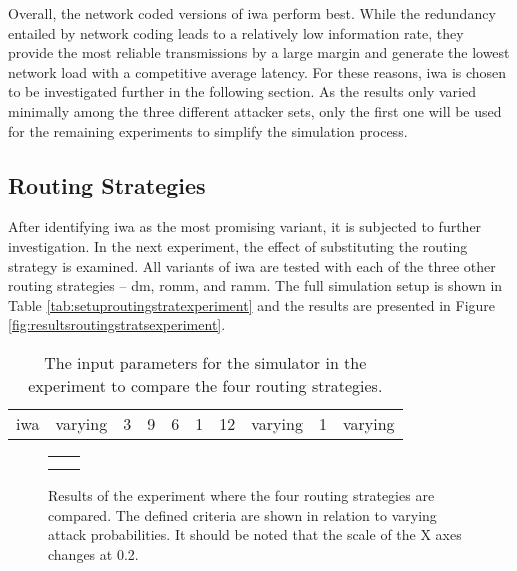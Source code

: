 Overall, the network coded versions of \gls{iwa} perform best. While the redundancy entailed by network coding leads to a relatively low information
rate, they provide the most reliable transmissions by a large margin and generate the lowest network load with a competitive average latency. For
these reasons, \gls{iwa} is chosen to be investigated further in the following section. As the results only varied minimally among the three different
attacker sets, only the first one will be used for the remaining experiments to simplify the simulation process.

\subsection{Routing Strategies}
After identifying \gls{iwa} as the most promising variant, it is subjected to further investigation. In the next experiment, the effect of substituting
the routing strategy is examined. All variants of \gls{iwa} are tested with each of the three other routing strategies -- \gls{dm}, \gls{romm}, and
\gls{ramm}. The full simulation setup is shown in Table \vref{tab:setuproutingstratexperiment} and the results are presented in Figure
\vref{fig:resultsroutingstratsexperiment}.

\begin{table}
    \centering
    \begin{tabulary}{\textwidth}{C|C|C|C|C|C|C|C|C|C}
        \pProtVar{} & \pNCMode{} & \pEncMods{} & \pAuthMods{} & \pRQSize{} & \pARQLimit{} & \pARQTimeout{} & \pRStrat{} & \pAttackerSet{} & \pAttackProb{} \\\hline
        \gls{iwa} & varying & 3 & 9 & 6 & 1 & 12 & varying & 1 & varying \\
    \end{tabulary}
    \caption[Input parameters for the routing strategies comparisons]{The input parameters for the simulator in the experiment to compare the four routing
    strategies.}
    \label{tab:setuproutingstratexperiment}
\end{table}

\begin{figure}
    \centering
    \begin{tabular}{cc}
         &  \\
         & 
    \end{tabular}
    \caption[Results for the routing strategies comparisons]{Results of the experiment where the four routing strategies are compared. The defined criteria
    are shown in relation to varying attack probabilities. It should be noted that the scale of the X axes changes at 0.2.}
    \label{fig:resultsroutingstratsexperiment}
\end{figure}

